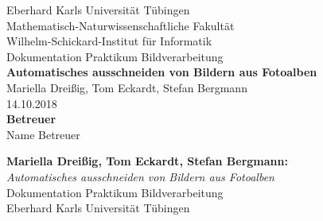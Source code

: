 \documentclass[twoside,12pt,a4paper]{scrreprt}
\begin{document}
\begin{titlepage}
\begin{center}
\LARGE Eberhard Karls Universität Tübingen\\
\large Mathematisch-Naturwissenschaftliche Fakultät \\
Wilhelm-Schickard-Institut für Informatik\\
[3cm]
\huge Dokumentation Praktikum Bildverarbeitung\\
[2cm]
\Large\textbf{Automatisches ausschneiden von Bildern aus Fotoalben}\\
[1.5cm]
\large Mariella Dreißig, Tom Eckardt, Stefan Bergmann\\
[0.5cm]
14.10.2018\\
\vfill
\small\textbf{Betreuer}\\[0.3cm]
\large Name Betreuer\\
\end{center}
\end{titlepage}

\thispagestyle{empty}
\vspace*{\fill}
\textbf{Mariella Dreißig, Tom Eckardt, Stefan Bergmann:}\\
\emph{Automatisches ausschneiden von Bildern aus Fotoalben}\\
Dokumentation Praktikum Bildverarbeitung \\
Eberhard Karls Universität Tübingen\\
\newpage


\newpage

\tableofcontents\label{toc}
\cleardoublepage


\cleardoublepage


\cleardoublepage


\cleardoublepage


\cleardoublepage


\cleardoublepage


\cleardoublepage


\cleardoublepage
\end{document}
